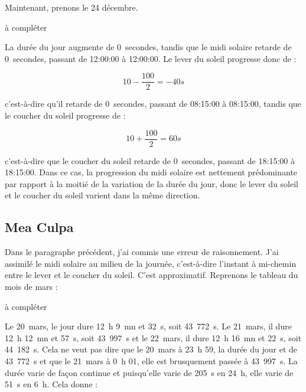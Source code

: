 \documentclass[a4paper]{article}
\newenvironment{texte}{\rmfamily}{}
\newcommand{\matable}{à compléter}
\newcommand{\veilaubehhmmss}[0]{08:15:00}
\newcommand{\veilmidihhmmss}[0]{12:00:00}
\newcommand{\veilsoirhhmmss}[0]{18:15:00}
\newcommand{\jouraubehhmmss}[0]{08:15:00}
\newcommand{\jourmidihhmmss}[0]{12:00:00}
\newcommand{\joursoirhhmmss}[0]{18:15:00}
\newcommand{\deltalumi}[0]{0}
\newcommand{\deltaaube}[0]{0}
\newcommand{\deltamidi}[0]{0}
\newcommand{\deltasoir}[0]{0}
\newcommand{\formuleaube}[0]{\[ 10 - \frac{100}{2} = -40 s \]}
\newcommand{\formulesoir}[0]{\[ 10 + \frac{100}{2} = 60 s \]}
\begin{document}
\begin{texte}
Maintenant, prenons le 24 décembre.

\vspace{2mm}
\matable
\vspace{2mm}

La durée du jour augmente de \deltalumi~secondes, tandis que le midi
solaire retarde de \deltamidi~secondes, passant de \veilmidihhmmss{} à \jourmidihhmmss.
Le lever du soleil progresse donc de :

\formuleaube{}

c'est-à-dire qu'il retarde de \deltaaube~secondes, passant
de \veilaubehhmmss{} à \jouraubehhmmss, tandis que le
coucher du soleil progresse de :

\formulesoir{}

c'est-à-dire que le coucher du soleil retarde de \deltasoir~secondes,
passant de \veilsoirhhmmss{} à \joursoirhhmmss{}.
Dans ce cas, la progression du midi solaire est nettement
prédominante par rapport à la moitié de la variation de la
durée du jour, donc le lever du soleil et le coucher
du soleil varient dans la même direction.

\vspace{5mm}

\subsection{Mea Culpa}

Dans le paragraphe précédent, j'ai commis une erreur de raisonnement.
J'ai assimilé le midi solaire au milieu de la journée, c'est-à-dire l'instant à mi-chemin entre
le lever et le coucher du soleil. C'est approximatif. Reprenons le
tableau du mois de mars :

\vspace{2mm}
\matable
\vspace{2mm}

Le 20~mars, le jour dure 12~h 9~mn et 32~s, soit 43~772~s.
Le 21~mars, il dure 12~h 12~mn et 57~s, soit 43~997~s
et le 22~mars, il dure 12~h 16~mn et 22~s, soit 44~182~s.
Cela ne veut pas dire que le 20~mars à 23~h 59, la durée
du jour et de 43~772~s et que le 21~mars à 0~h 01, elle est
brusquement passée à 43~997~s. La durée varie de façon continue
et puisqu'elle varie de 205~s en 24~h, elle varie de 51~s en 6~h.
Cela donne :


\end{texte}
\end{document}

